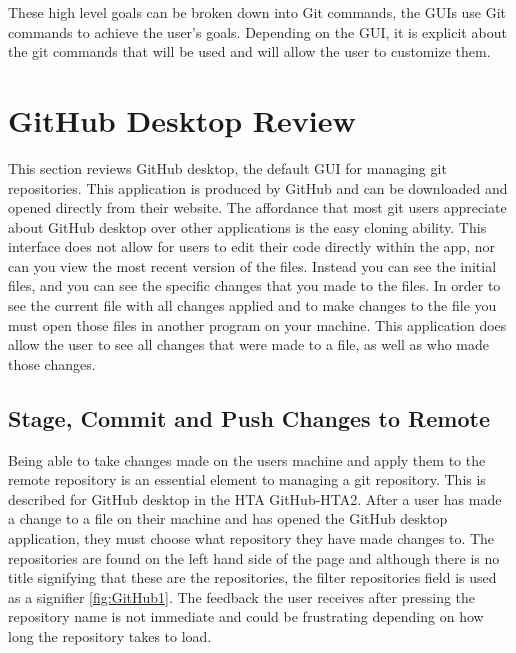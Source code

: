 \documentclass{sigchi}
\begin{document}
 These high level goals can be broken down into Git commands, the GUIs use Git commands to achieve the user's goals. Depending on the GUI,
it is explicit about the git commands that will be used and will allow the user to customize them. 

\section{GitHub Desktop Review}
This section reviews GitHub desktop, the default GUI for managing git repositories.
This application is produced by GitHub and can be downloaded and opened directly from 
their website. The affordance that most git users appreciate about GitHub desktop over 
other applications is the easy cloning ability. This interface does not allow for users 
to edit their code directly within the app, nor can you view the most recent version of 
the files. Instead you can see the initial files, and you can see the specific changes
that you made to the files. In order to see the current file with all changes applied
and to make changes to the file you must open those files in another program on your 
machine. This application does allow the user to see all changes that were made to a file, 
as well as who made those changes.
 
\subsection{Stage, Commit and Push Changes to Remote}
Being able to take changes made on the users machine and apply them to the remote repository 
is an essential element to managing a git repository. This is described for GitHub desktop in
the HTA GitHub-HTA2. After a user has made a change to a file on their machine and has 
opened the GitHub desktop application, they must choose what repository they have made changes 
to. The repositories are found on the left hand side of the page and although there is no title 
signifying that these are the repositories, the filter repositories field is used as a signifier \ref{fig:GitHub1}. The feedback the user receives after pressing the repository name is not immediate and could be
frustrating depending on how long the repository takes to load. 
\end{document}
